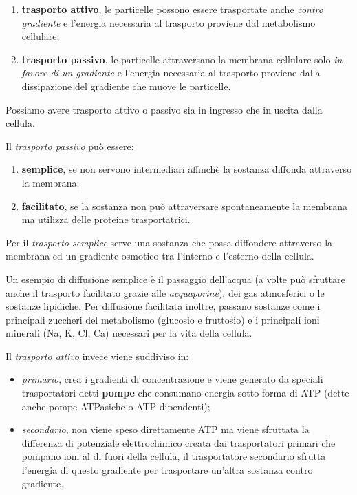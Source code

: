 \documentclass[]{article}
\begin{document}
\begin{enumerate}
\def\labelenumi{\arabic{enumi}.}
\itemsep1pt\parskip0pt
\item
  \textbf{trasporto attivo}, le particelle possono essere trasportate
  anche \emph{contro gradiente} e l'energia necessaria al trasporto
  proviene dal metabolismo cellulare;
\item
  \textbf{trasporto passivo}, le particelle attraversano la membrana
  cellulare solo \emph{in favore di un gradiente} e l'energia necessaria
  al trasporto proviene dalla dissipazione del gradiente che muove le
  particelle.
\end{enumerate}

Possiamo avere trasporto attivo o passivo sia in ingresso che in uscita
dalla cellula.

Il \emph{trasporto passivo} può essere:

\begin{enumerate}
\def\labelenumi{\arabic{enumi}.}
\itemsep1pt\parskip0pt
\item
  \textbf{semplice}, se non servono intermediari affinchè la sostanza
  diffonda attraverso la membrana;
\item
  \textbf{facilitato}, se la sostanza non può attraversare
  spontaneamente la membrana ma utilizza delle proteine trasportatrici.
\end{enumerate}

Per il \emph{trasporto semplice} serve una sostanza che possa diffondere
attraverso la membrana ed un gradiente osmotico tra l'interno e
l'esterno della cellula.

Un esempio di diffusione semplice è il passaggio dell'acqua (a volte può
sfruttare anche il trasporto facilitato grazie alle \emph{acquaporine}),
dei gas atmosferici o le sostanze lipidiche. Per diffusione facilitata
inoltre, passano sostanze come i principali zuccheri del metabolismo
(glucosio e fruttosio) e i principali ioni minerali (Na, K, Cl, Ca)
necessari per la vita della cellula.

Il \emph{trasporto attivo} invece viene suddiviso in:

\begin{itemize}
\itemsep1pt\parskip0pt
\item
  \emph{primario}, crea i gradienti di concentrazione e viene generato
  da speciali trasportatori detti \textbf{pompe} che consumano energia
  sotto forma di ATP (dette anche pompe ATPasiche o ATP dipendenti);
\item
  \emph{secondario}, non viene speso direttamente ATP ma viene sfruttata
  la differenza di potenziale elettrochimico creata dai trasportatori
  primari che pompano ioni al di fuori della cellula, il trasportatore
  secondario sfrutta l'energia di questo gradiente per trasportare
  un'altra sostanza contro gradiente.
\end{itemize}
\end{document}
